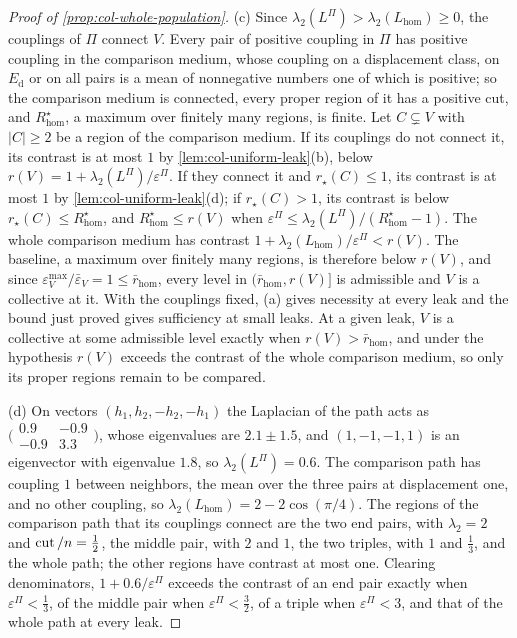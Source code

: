 \begin{proof}[Proof of \cref{prop:col-whole-population}]
(c) Since $\lambda_2(L^\Pi)>\lambda_2(L_{\mathrm{hom}})\ge0$, the couplings of $\Pi$ connect $V$. Every pair of positive coupling in $\Pi$ has positive coupling in the comparison medium, whose coupling on a displacement class, on $E_{\mathrm d}$ or on all pairs is a mean of nonnegative numbers one of which is positive; so the comparison medium is connected, every proper region of it has a positive cut, and $R^\star_{\mathrm{hom}}$, a maximum over finitely many regions, is finite. Let $C\subsetneq V$ with $|C|\ge2$ be a region of the comparison medium. If its couplings do not connect it, its contrast is at most $1$ by \cref{lem:col-uniform-leak}(b), below $r(V)=1+\lambda_2(L^\Pi)/\varepsilon^\Pi$. If they connect it and $r_\star(C)\le1$, its contrast is at most $1$ by \cref{lem:col-uniform-leak}(d); if $r_\star(C)>1$, its contrast is below $r_\star(C)\le R^\star_{\mathrm{hom}}$, and $R^\star_{\mathrm{hom}}\le r(V)$ when $\varepsilon^\Pi\le\lambda_2(L^\Pi)/(R^\star_{\mathrm{hom}}-1)$. The whole comparison medium has contrast $1+\lambda_2(L_{\mathrm{hom}})/\varepsilon^\Pi<r(V)$. The baseline, a maximum over finitely many regions, is therefore below $r(V)$, and since $\varepsilon^{\max}_V/\bar\varepsilon_V=1\le\bar r_{\mathrm{hom}}$, every level in $(\bar r_{\mathrm{hom}},r(V)]$ is admissible and $V$ is a collective at it. With the couplings fixed, (a) gives necessity at every leak and the bound just proved gives sufficiency at small leaks. At a given leak, $V$ is a collective at some admissible level exactly when $r(V)>\bar r_{\mathrm{hom}}$, and under the hypothesis $r(V)$ exceeds the contrast of the whole comparison medium, so only its proper regions remain to be compared.

(d) On vectors $(h_1,h_2,-h_2,-h_1)$ the Laplacian of the path acts as $\bigl(\begin{smallmatrix}0.9&-0.9\\-0.9&3.3\end{smallmatrix}\bigr)$, whose eigenvalues are $2.1\pm1.5$, and $(1,-1,-1,1)$ is an eigenvector with eigenvalue $1.8$, so $\lambda_2(L^\Pi)=0.6$. The comparison path has coupling $1$ between neighbors, the mean over the three pairs at displacement one, and no other coupling, so $\lambda_2(L_{\mathrm{hom}})=2-2\cos(\pi/4)$. The regions of the comparison path that its couplings connect are the two end pairs, with $\lambda_2=2$ and $\operatorname{cut}/n=\frac12$, the middle pair, with $2$ and $1$, the two triples, with $1$ and $\frac13$, and the whole path; the other regions have contrast at most one. Clearing denominators, $1+0.6/\varepsilon^\Pi$ exceeds the contrast of an end pair exactly when $\varepsilon^\Pi<\frac13$, of the middle pair when $\varepsilon^\Pi<\frac32$, of a triple when $\varepsilon^\Pi<3$, and that of the whole path at every leak.
\end{proof}

